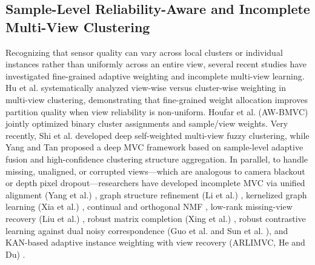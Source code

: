\documentclass[11pt, a4paper]{article}
\begin{document}
\subsection{Sample-Level Reliability-Aware and Incomplete Multi-View Clustering}
\label{subsec:rw_reliability}
Recognizing that sensor quality can vary across local clusters or individual instances rather than uniformly across an entire view, several recent studies have investigated fine-grained adaptive weighting and incomplete multi-view learning. Hu et al. \cite{hu2022view} systematically analyzed view-wise versus cluster-wise weighting in multi-view clustering, demonstrating that fine-grained weight allocation improves partition quality when view reliability is non-uniform. Houfar et al. (AW-BMVC) \cite{houfar2023automatically} jointly optimized binary cluster assignments and sample/view weights. Very recently, Shi et al. \cite{shi2025deep} developed deep self-weighted multi-view fuzzy clustering, while Yang and Tan \cite{yang2025deep} proposed a deep MVC framework based on sample-level adaptive fusion and high-confidence clustering structure aggregation. In parallel, to handle missing, unaligned, or corrupted views—which are analogous to camera blackout or depth pixel dropout—researchers have developed incomplete MVC via unified alignment (Yang et al.) \cite{yang2022robust}, graph structure refinement (Li et al.) \cite{li2022refining}, kernelized graph learning (Xia et al.) \cite{xia2023incomplete}, continual and orthogonal NMF \cite{wan2023fast, wan2024fast, liang2022incomplete}, low-rank missing-view recovery (Liu et al.) \cite{liu2024low}, robust matrix completion (Xing et al.) \cite{xing2025incomplete}, robust contrastive learning against dual noisy correspondence (Guo et al. \cite{guo2024robust} and Sun et al. \cite{sun2024robust}), and KAN-based adaptive instance weighting with view recovery (ARLIMVC, He and Du) \cite{he2026adaptive}.
\end{document}
